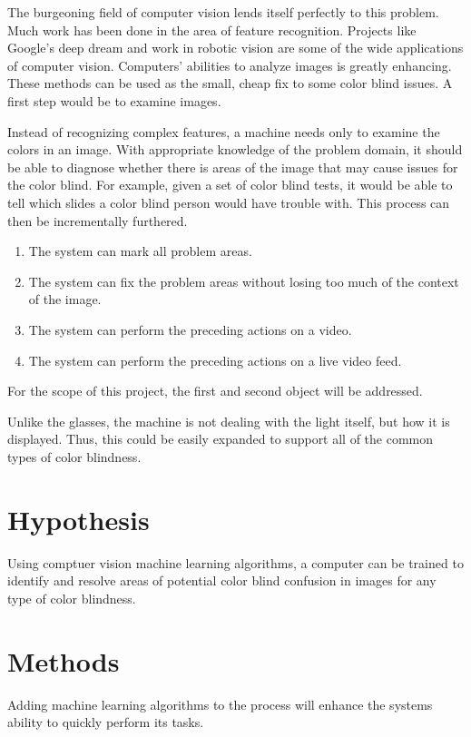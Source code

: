 \documentclass[12pt]{article}
\begin{document}
The burgeoning field of computer vision lends itself perfectly to this problem. Much work has been done in the area of feature recognition. Projects like Google's deep dream and work in robotic vision are some of the wide applications of computer vision. Computers' abilities to analyze images is greatly enhancing. These methods can be used as the small, cheap fix to some color blind issues. A first step would be to examine images.

Instead of recognizing complex features, a machine needs only to examine the colors in an image. With appropriate knowledge of the problem domain, it should be able to diagnose whether there is areas of the image that may cause issues for the color blind. For example, given a set of color blind tests, it would be able to tell which slides a color blind person would have trouble with. This process can then be incrementally furthered.

\begin{enumerate}
	\item The system can mark all problem areas.
	\item The system can fix the problem areas without losing too much of the context of the image.
	\item The system can perform the preceding actions on a video.
	\item The system can perform the preceding actions on a live video feed.
\end{enumerate}

For the scope of this project, the first and second object will be addressed.

Unlike the glasses, the machine is not dealing with the light itself, but how it is displayed. Thus, this could be easily expanded to support all of the common types of color blindness. 


\section{Hypothesis}
Using comptuer vision machine learning algorithms, a computer can be trained to identify and resolve areas of potential color blind confusion in images for any type of color blindness.

\section{Methods}

Adding machine learning algorithms to the process will enhance the systems ability to quickly perform its tasks.
\end{document}
